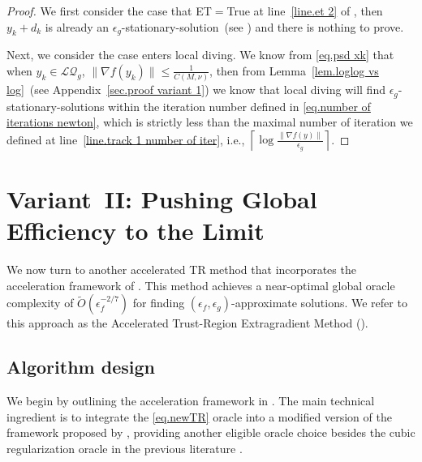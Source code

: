 \documentclass{article}
\numberwithin{equation}{section}
\numberwithin{equation}{section}
\begin{document}
\begin{proof}
    We first consider the case that ET$=$True at line~\ref{line.et 2} of , then $y_k+d_k$ is already an $\epsilon_g$-stationary-solution~(see ) and there is nothing to prove.

    Next, we consider the case  enters local diving. We know from \eqref{eq.psd xk} that when $y_k\in\mathcal{LQ}_g$, $\|\nabla f(y_k)\|\leq \frac{1}{C(M,\nu)}$, then from Lemma~\ref{lem.loglog vs log}~(see Appendix~\ref{sec.proof variant 1}) we know that local diving will find $\epsilon_g$-stationary-solutions within the iteration number defined in \eqref{eq.number of iterations newton}, which is strictly less than the maximal number of iteration we defined at line~\ref{line.track 1 number of iter}, i.e., $\left \lceil\log\frac{\|\nabla f(y)\|}{\epsilon_g} \right\rceil$.
\end{proof}


\section{Variant~II: Pushing Global Efficiency to the Limit}\label{sec.second variant}
We now turn to another accelerated TR method that incorporates the acceleration framework of \citet{monteiro2013accelerated}. This method achieves a near-optimal global oracle complexity of $\tilde{O}(\epsilon_f^{-2/7})$ for finding $(\epsilon_f,\epsilon_g)$-approximate solutions. We refer to this approach as the Accelerated Trust-Region Extragradient Method ().
\subsection{Algorithm design}
We begin by outlining the acceleration framework in . The main technical ingredient is to integrate the \ref{eq.newTR} oracle into a modified version of the framework proposed by \citet{monteiro2013accelerated}, providing another eligible oracle choice besides the cubic regularization oracle in the previous literature \cite{carmon2022optimal}.
\end{document}
